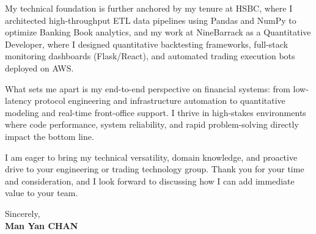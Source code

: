 \documentclass[10pt,a4paper]{article}
\begin{document}
My technical foundation is further anchored by my tenure at HSBC, where I architected high-throughput ETL data pipelines using Pandas and NumPy to optimize Banking Book analytics, and my work at NineBarrack as a Quantitative Developer, where I designed quantitative backtesting frameworks, full-stack monitoring dashboards (Flask/React), and automated trading execution bots deployed on AWS. 

What sets me apart is my end-to-end perspective on financial systems: from low-latency protocol engineering and infrastructure automation to quantitative modeling and real-time front-office support. I thrive in high-stakes environments where code performance, system reliability, and rapid problem-solving directly impact the bottom line.

I am eager to bring my technical versatility, domain knowledge, and proactive drive to your engineering or trading technology group. Thank you for your time and consideration, and I look forward to discussing how I can add immediate value to your team.

\vspace{3ex}

\noindent
Sincerely,\\[1.5ex]
\textbf{Man Yan CHAN}
\end{document}
